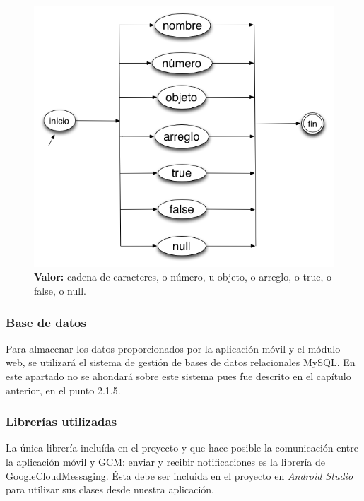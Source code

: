 \begin{figure}[H]
\centering
\includegraphics[scale=0.50]{images/capitulo3/afd3.png}
\caption{\textbf{Valor:} cadena de caracteres, o número, u objeto, o arreglo, o true, o false, o null.}
\label{valor}
\end{figure}

\subsubsection{Base de datos}

Para almacenar los datos proporcionados por la aplicación móvil y el módulo web,  se utilizará el sistema de gestión de bases de datos relacionales MySQL. En este apartado no se ahondará  sobre este sistema pues fue descrito en el capítulo anterior, en el punto 2.1.5.\\

\subsubsection{Librerías utilizadas}

La única librería incluída en el proyecto y que hace posible la comunicación entre la aplicación móvil y GCM: enviar y recibir notificaciones es la librería de GoogleCloudMessaging. Ésta debe ser incluida en el proyecto en \textit{Android Studio} para utilizar sus clases desde nuestra aplicación.\\

